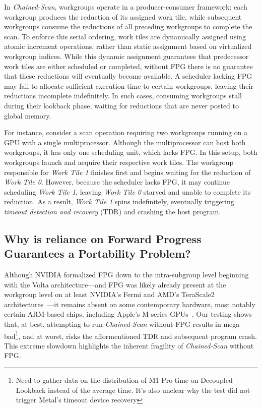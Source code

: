\documentclass[sigconf]{acmart}
\begin{document}
In \emph{Chained-Scan}, workgroups operate in a producer-consumer framework: each workgroup produces the reduction of its assigned work tile, while subsequent workgroups consume the reductions of all preceding workgroups to complete the scan. To enforce this serial ordering, work tiles are dynamically assigned using atomic increment operations, rather than static assignment based on virtualized workgroup indices. While this dynamic assignment guarantees that predecessor work tiles are either scheduled or completed, without FPG there is no guarantee that these reductions will eventually become available. A scheduler lacking FPG may fail to allocate sufficient execution time to certain workgroups, leaving their reductions incomplete indefinitely. In such cases, consuming workgroups stall during their lookback phase, waiting for reductions that are never posted to global memory.

For instance, consider a scan operation requiring two workgroups running on a GPU with a single multiprocessor. Although the multiprocessor can host both workgroups, it has only one scheduling unit, which lacks FPG\@. In this setup, both workgroups launch and acquire their respective work tiles. The workgroup responsible for \emph{Work Tile 1} finishes first and begins waiting for the reduction of \emph{Work Tile 0}. However, because the scheduler lacks FPG, it may continue scheduling \emph{Work Tile 1}, leaving \emph{Work Tile 0} starved and unable to complete its reduction. As a result, \emph{Work Tile 1} spins indefinitely, eventually triggering \emph{timeout detection and recovery} (TDR) and crashing the host program.

\subsection{Why is reliance on Forward Progress Guarantees a Portability Problem?}
Although NVIDIA formalized FPG down to the intra-subgroup level beginning with the Volta architecture---and FPG was likely already present at the workgroup level on at least NVIDIA's Fermi and AMD's TeraScale2 architectures~\cite{}---it remains absent on some contemporary hardware, most notably certain ARM-based chips, including Apple's M-series GPUs~\cite{10.1145/3485508}. Our testing shows that, at best, attempting to run \emph{Chained-Scan} without FPG results in mega-bad\footnote{Need to gather data on the distribution of M1 Pro time on Decoupled Lookback instead of the average time. It's also unclear why the test did not trigger Metal's timeout device recovery}, and at worst, risks the afformentioned TDR and subsequent program crash. This extreme slowdown highlights the inherent fragility of \emph{Chained-Scan} without FPG\@.
\end{document}
